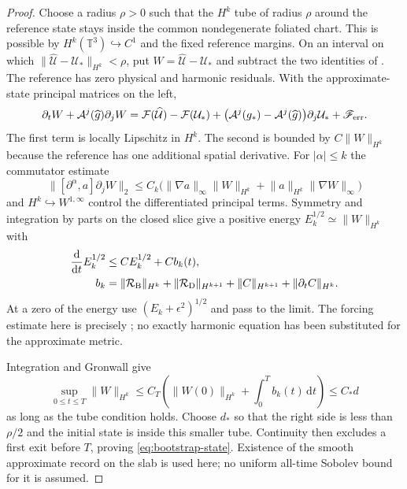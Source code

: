 \documentclass[11pt]{article}
\numberwithin{equation}{section}
\theoremstyle{definition}
\theoremstyle{remark}
\newcommand{\dd}{\mathrm d}
\newcommand{\norm}[1]{\lVert#1\rVert}
\begin{document}
\begin{proof}
Choose a radius $\rho>0$ such that the $H^k$ tube of radius $\rho$ around
the reference state stays inside the common nondegenerate foliated chart.
This is possible by $H^k(\mathbb T^3)\hookrightarrow C^1$ and the fixed
reference margins. On an interval on which
$\norm{\widehat{\mathcal U}-\mathcal U_*}_{H^k}<\rho$, put
$W=\widehat{\mathcal U}-\mathcal U_*$ and subtract the two identities of
. The reference has zero physical and harmonic
residuals. With the approximate-state principal matrices on the left,
\[
 \partial_tW+\mathcal A^j(\widehat g)\partial_jW
 =\mathcal F(\widehat{\mathcal U})-\mathcal F(\mathcal U_*)
  +\bigl(\mathcal A^j(g_*)-\mathcal A^j(\widehat g)\bigr)
          \partial_j\mathcal U_*+\mathscr F_{\rm err}.
\]
The first term is locally Lipschitz in $H^k$. The second is bounded by
$C\norm W_{H^k}$ because the reference has one additional spatial derivative.
For $|\alpha|\le k$ the commutator estimate
\[
 \norm{[\partial^\alpha,a]\partial_jW}_2
 \le C_k\bigl(\norm{\nabla a}_\infty\norm W_{H^k}
                +\norm a_{H^k}\norm{\nabla W}_\infty\bigr)
\]
and $H^k\hookrightarrow W^{1,\infty}$ control the differentiated principal
terms. Symmetry and integration by parts on the closed slice give a positive
energy $E_k^{1/2}\simeq\norm W_{H^k}$ with
\begin{equation}
 \begin{aligned}
 \frac{\dd}{\dd t}E_k^{1/2}&\le C E_k^{1/2}+C b_k(t),\\
 b_k&=\norm{\mathcal R_{\rm B}}_{H^k}
      +\norm{\mathcal R_{\rm D}}_{H^{k+1}}
      +\norm C_{H^{k+1}}+\norm{\partial_tC}_{H^k}.
 \end{aligned}
 \label{eq:actual-jet-gauge-energy}
\end{equation}
At a zero of the energy use $(E_k+\epsilon^2)^{1/2}$ and pass to the limit.
The forcing estimate here is precisely
; no exactly harmonic equation has
been substituted for the approximate metric.

Integration and Gronwall give
\begin{equation}
 \sup_{0\le t\le T}\norm W_{H^k}
 \le C_T\left(\norm{W(0)}_{H^k}+\int_0^T b_k(t)\,\dd t\right)
 \le C_*d
 \label{eq:actual-jet-integrated-stability}
\end{equation}
as long as the tube condition holds. Choose $d_*$ so that the right side is
less than $\rho/2$ and the initial state is inside this smaller tube.
Continuity then excludes a first exit before $T$, proving
\eqref{eq:bootstrap-state}. Existence of the smooth approximate record on
the slab is used here; no uniform all-time Sobolev bound for it is assumed.


\end{proof}
\end{document}
